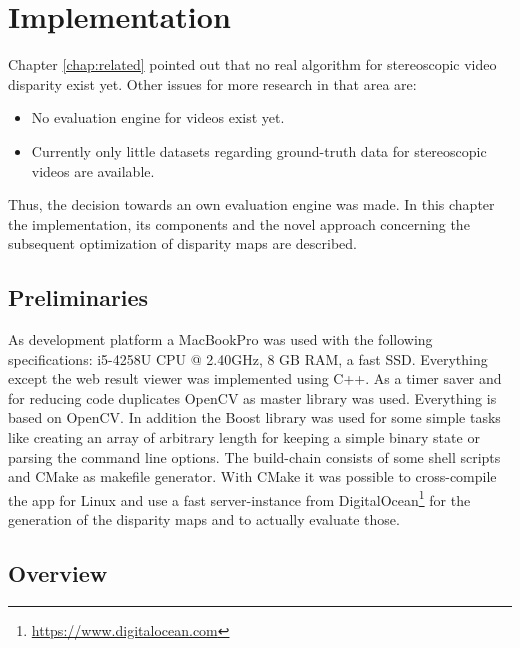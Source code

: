 \chapter{Implementation}
\label{chap:impl}

Chapter \ref{chap:related} pointed out that no real algorithm for stereoscopic video disparity exist yet.
Other issues for more research in that area are:

\begin{itemize}
  \item No evaluation engine for videos exist yet.
  \item Currently only little datasets regarding ground-truth data for stereoscopic videos are available.
\end{itemize}

\noindent Thus, the decision towards an own evaluation engine was made.
In this chapter the implementation, its components and the novel approach concerning the subsequent optimization of disparity maps are described.

\section{Preliminaries}

As development platform a MacBookPro was used with the following specifications: i5-4258U CPU @ 2.40GHz, 8 GB RAM, a fast SSD.
Everything except the web result viewer was implemented using C++.
As a timer saver and for reducing code duplicates OpenCV as master library was used.
Everything is based on OpenCV.
In addition the Boost library was used for some simple tasks like creating an array of arbitrary length for keeping a simple binary state or parsing the command line options.
The build-chain consists of some shell scripts and CMake as makefile generator.
With CMake it was possible to cross-compile the app for Linux and use a fast server-instance from DigitalOcean\footnote{\url{https://www.digitalocean.com}} for the generation of the disparity maps and to actually evaluate those.

\section{Overview}

